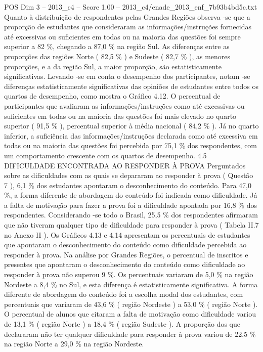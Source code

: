 \begin{textsample}{POS Dim 3 – 2013\_c4 – Score 1.00 – 2013\_c4/enade\_2013\_enf\_7b93b4bd5c.txt}
Quanto à distribuição de respondentes pelas Grandes Regiões observa -se que a proporção de estudantes que consideraram as informações/instruções fornecidas até excessivas ou suficientes em todas ou na maioria das questões foi sempre superior a 82 \%, chegando a 87,0 \% na região Sul.
As diferenças entre as proporções das regiões Norte ( 82,5 \% ) e Sudeste ( 82,7 \% ), as menores proporções, e a da região Sul, a maior proporção, são estatisticamente significativas.
Levando -se em conta o desempenho dos participantes, notam -se diferenças estatisticamente significativas das opiniões de estudantes entre todos os quartos de desempenho, como mostra o Gráfico 4.12.
O percentual de participantes que avaliaram as informações/instruções como até excessivas ou suficientes em todas ou na maioria das questões foi mais elevado no quarto superior ( 91,5 \% ), percentual superior à média nacional ( 84,2 \% ).
Já no quarto inferior, a suficiência das informações/instruções declarada como até excessiva em todas ou na maioria das questões foi percebida por 75,1 \% dos respondentes, com um comportamento crescente com os quartos de desempenho. 4.5 DIFICULDADE ENCONTRADA AO RESPONDER À PROVA Perguntados sobre as dificuldades com as quais se depararam ao responder à prova ( Questão 7 ), 6,1 \% dos estudantes apontaram o desconhecimento do conteúdo.
Para 47,0 \%, a forma diferente de abordagem do conteúdo foi indicada como dificuldade.
Já a falta de motivação para fazer a prova foi a dificuldade apontada por 16,8 \% dos respondentes.
Considerando -se todo o Brasil, 25,5 \% dos respondentes afirmaram que não tiveram qualquer tipo de dificuldade para responder à prova ( Tabela II.7 no Anexo II ).
Os Gráficos 4.13 e 4.14 apresentam os percentuais de estudantes que apontaram o desconhecimento do conteúdo como dificuldade percebida ao responder à prova.
Na análise por Grandes Regiões, o percentual de inscritos e presentes que apontaram o desconhecimento do conteúdo como dificuldade ao responder à prova não superou 9 \%.
Os percentuais variaram de 5,0 \% na região Nordeste a 8,4 \% no Sul, e esta diferença é estatisticamente significativa.
A forma diferente de abordagem do conteúdo foi a escolha modal dos estudantes, com percentuais que variaram de 43,6 \% ( região Nordeste ) a 53,0 \% ( região Norte ).
O percentual de alunos que citaram a falta de motivação como dificuldade variou de 13,1 \% ( região Norte ) a 18,4 \% ( região Sudeste ).
A proporção dos que declararam não ter qualquer dificuldade para responder à prova variou de 22,5 \% na região Norte a 29,0 \% na região Nordeste.

\end{textsample}
